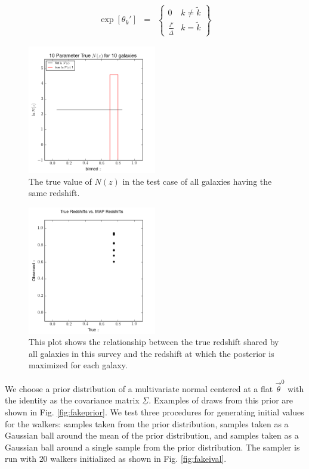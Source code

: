 \documentclass[preprint]{aastex}
\newcommand{\textul}{\underline}
\begin{document}
\begin{eqnarray}
\label{eq:faketheta}
\exp[\theta_{k}'] &=& \left\{\begin{array}{cc}0&k\neq\tilde{k}\\ \frac{J'}{\bar{\Delta}}&k=\tilde{k}\end{array}\right\}
\end{eqnarray}

\begin{figure}
\includegraphics[width=0.5\textwidth]{toy/trueNz.png}
\caption{The true value of $N(z)$ in the test case of all galaxies having the same redshift.}
\label{fig:deltatrueNz}
\end{figure}

\begin{figure}
\includegraphics[width=0.5\textwidth]{toy/truevmap.png}
\caption{This plot shows the relationship between the true redshift shared by all galaxies in this survey and the redshift at which the posterior is maximized for each galaxy.}
\label{fig:toycat}
\end{figure}

We choose a prior distribution of a multivariate normal centered at a flat $\vec{\theta}^{0}$ with the identity as the covariance matrix $\textul{\Sigma}$.  Examples of draws from this prior are shown in Fig. \ref{fig:fakeprior}.  We test three procedures for generating initial values for the walkers: samples taken from the prior distribution, samples taken as a Gaussian ball around the mean of the prior distribution, and samples taken as a Gaussian ball around a single sample from the prior distribution.  The sampler is run with $20$ walkers initialized as shown in Fig. \ref{fig:fakeival}.
\end{document}
